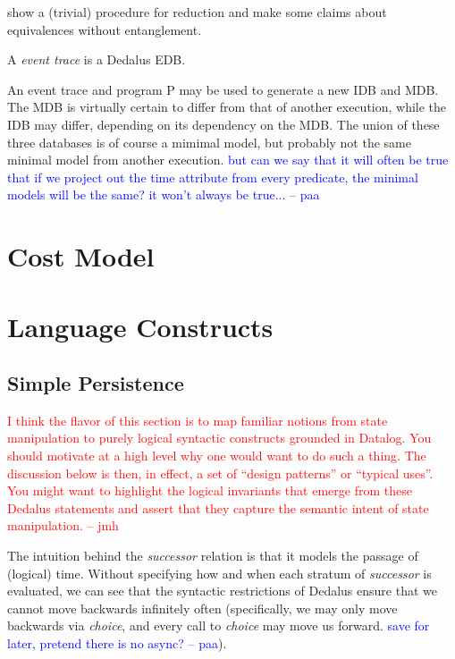 \documentclass{acm_proc_article-sp-sigmod09}
\newcommand{\jmh}[1]{{\textcolor{red}{#1 -- jmh}}}
\newcommand{\paa}[1]{{\textcolor{blue}{#1 -- paa}}}
\begin{document}
show a (trivial) procedure for reduction and make some claims about equivalences without entanglement.

\begin{definition}
A \emph{event trace} is a Dedalus EDB.
\end{definition}

An event trace and program P may be used to generate a new IDB and MDB.  The MDB is virtually certain to differ from that of another
execution, while the IDB may differ, depending on its dependency on the MDB.  The union of these three databases is of course a
mimimal model, but probably not the same minimal model from another execution.  \paa{but can we say that it will often be true that if we project 
out the time attribute from every predicate, the minimal models will be the same? it won't always be true...}

\section{Cost Model}
 
 \section{Language Constructs}
\subsection{Simple Persistence}
\jmh{I think the flavor of this section is to map familiar notions from state manipulation to purely logical syntactic constructs grounded in Datalog.  You should motivate at a high level why one would want to do such a thing.  The discussion below is then, in effect, a set of ``design patterns'' or ``typical uses''.  You might want to highlight the logical invariants that emerge from these Dedalus statements and assert that they capture the semantic intent of state manipulation.}



The intuition behind the \emph{successor} relation is that it models the passage of (logical) time.  Without specifying how and when each stratum
of \emph{successor} is evaluated, we can see that the syntactic restrictions of Dedalus ensure that we cannot move backwards infinitely often (specifically,
we may only move backwards via \emph{choice}, and every call to \emph{choice} may move us forward.  \paa{save for later, pretend there is no async?}).
\end{document}
